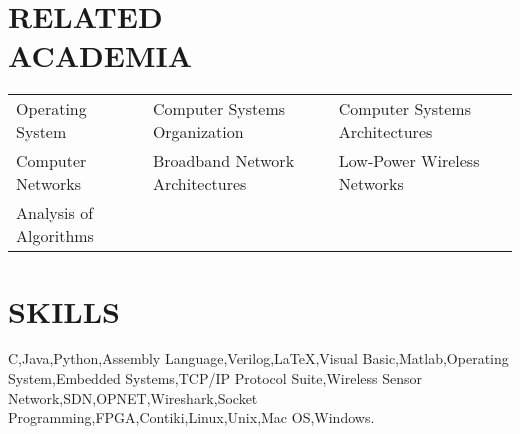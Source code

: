 \documentclass[margin,line]{resume}
\begin{document}
\begin{resume}
\sectionline

    \section{\mysidestyle \textbf{\large{R}\small{ELATED\\ACADEMIA}}} 

	\vspace{1mm} %
	\begin{tabular}{@{}p{4cm}p{5.5cm}p{5.5cm}}
	Operating System     &  Computer Systems Organization        &  Computer Systems Architectures\\
	Computer Networks    &  Broadband Network Architectures      &  Low-Power Wireless Networks\\
	Analysis of Algorithms %
	\vspace{3mm}
	\end{tabular}


\sectionline

    \section{\mysidestyle \textbf{\large{S}\small{KILLS}}}

    C,\hspace{2mm}Java,\hspace{2mm}Python,\hspace{2mm}Assembly Language,\hspace{2mm}Verilog,\hspace{2mm}\LaTeX,\hspace{2mm}Visual Basic,\hspace{2mm}Matlab,\hspace{2mm}Operating System,\hspace{2mm}Embedded Systems,\hspace{2mm}TCP/IP Protocol Suite,\hspace{2mm}Wireless Sensor Network,\hspace{2mm}SDN,\hspace{2mm}OPNET,\hspace{2mm}Wireshark,\hspace{2mm}Socket Programming,\hspace{2mm}FPGA,\hspace{2mm}Contiki,\hspace{2mm}Linux,\hspace{2mm}Unix,\hspace{2mm}Mac OS,\hspace{2mm}Windows.


\end{resume}
\end{document}
